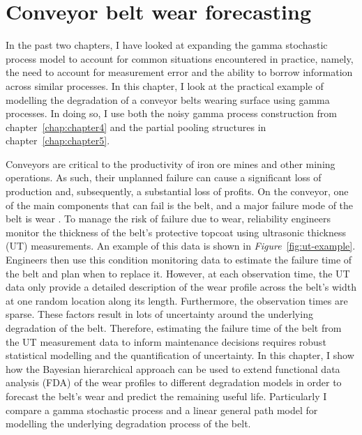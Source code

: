 \chapter{Conveyor belt wear forecasting} \label{chap:chapter6}

In the past two chapters, I have looked at expanding the gamma stochastic process model to account for common situations encountered in practice, namely, the need to account for measurement error and the ability to borrow information across similar processes. In this chapter, I look at the practical example of modelling the degradation of a conveyor belts wearing surface using gamma processes. In doing so, I use both the noisy gamma process construction from chapter~\ref{chap:chapter4} and the partial pooling structures in chapter~\ref{chap:chapter5}.

Conveyors are critical to the productivity of iron ore mines and other mining operations. As such, their unplanned failure can cause a significant loss of production and, subsequently, a substantial loss of profits. On the conveyor, one of the main components that can fail is the belt, and a major failure mode of the belt is wear \citep{bortnowski_2022}. To manage the risk of failure due to wear, reliability engineers monitor the thickness of the belt's protective topcoat using ultrasonic thickness (UT) measurements. An example of this data is shown in \textit{Figure}~\ref{fig:ut-example}. Engineers then use this condition monitoring data to estimate the failure time of the belt and plan when to replace it. However, at each observation time, the UT data only provide a detailed description of the wear profile across the belt's width at one random location along its length. Furthermore, the observation times are sparse. These factors result in lots of uncertainty around the underlying degradation of the belt. Therefore, estimating the failure time of the belt from the UT measurement data to inform maintenance decisions requires robust statistical modelling and the quantification of uncertainty. In this chapter, I show how the Bayesian hierarchical approach can be used to extend functional data analysis (FDA) of the wear profiles to different degradation models in order to forecast the belt's wear and predict the remaining useful life. Particularly I compare a gamma stochastic process and a linear general path model for modelling the underlying degradation process of the belt.

